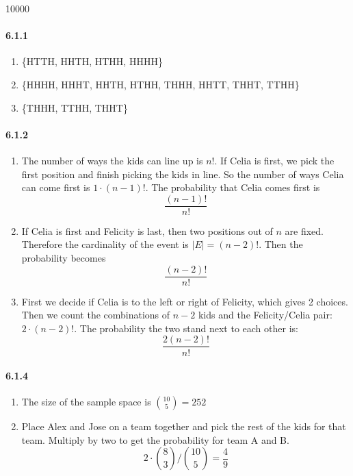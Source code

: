\documentclass[11pt, letterpaper, twocolumn, fleqn]{article}
\begin{document}
\renewcommand{\labelenumi}{\alph{enumi}.}
\renewcommand{\labelenumii}{(\arabic{enumii})}
\renewcommand{\qedsymbol}{$\blacksquare$}

 10000
\raggedbottom
\pagestyle{headings}

\paragraph{6.1.1}
\begin{enumerate}
  \item \{HTTH, HHTH, HTHH, HHHH\}
  \item \{HHHH, HHHT, HHTH, HTHH, THHH, HHTT, THHT, TTHH\}
  \item \{THHH, TTHH, THHT\}
\end{enumerate}

\paragraph{6.1.2}
\begin{enumerate}
  \item The number of ways the kids can line up is $n!$. If Celia is first, we pick the first position and finish picking the kids in line. So the number of ways Celia can come first is $1 \cdot (n-1)!$. The probability that Celia comes first is 
    $$\frac{(n-1)!}{n!}$$
  
  \item If Celia is first and Felicity is last, then two positions out of $n$ are fixed. Therefore the cardinality of the event is $|E|=(n-2)!$. Then the probability becomes
    $$\frac{(n-2)!}{n!}$$
    
  \item First we decide if Celia is to the left or right of Felicity, which gives 2 choices. Then we count the combinations of $n-2$ kids and the Felicity/Celia pair: $2 \cdot (n-2)!$. The probability the two stand next to each other is:
    $$\frac{2(n-2)!}{n!}$$
\end{enumerate}

\paragraph{6.1.4}
\begin{enumerate}
  \item The size of the sample space is $\binom{10}{5} = 252$
  \item Place Alex and Jose on a team together and pick the rest of the kids for that team. Multiply by two to get the probability for team A and B.
    $$2 \cdot \binom{8}{3} / \binom{10}{5} = \frac{4}{9}$$
\end{enumerate}
\end{document}
